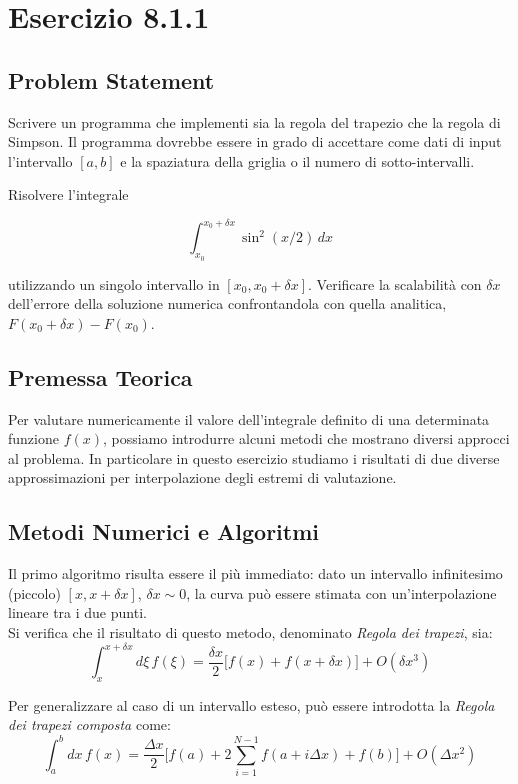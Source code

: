 
\section{Esercizio 8.1.1}
\subsection{Problem Statement}
Scrivere un programma che implementi sia la regola del trapezio che la regola di Simpson. Il programma dovrebbe essere in grado di accettare come dati di input l'intervallo $[a, b]$ e la spaziatura della griglia o il numero di sotto-intervalli.

\noindent Risolvere l'integrale

\[
\int_{x_0}^{x_0+\delta x} \sin^2(x/2) \, dx
\]

\noindent utilizzando un singolo intervallo in $[x_0, x_0 + \delta x]$. Verificare la scalabilità con $\delta x$ dell'errore della soluzione numerica confrontandola con quella analitica, $F(x_0 + \delta x) - F(x_0)$.

\subsection{Premessa Teorica}
Per valutare numericamente il valore dell'integrale definito di una determinata funzione $f(x)$, possiamo introdurre alcuni metodi che mostrano diversi approcci al problema. In particolare in questo esercizio studiamo i risultati di due diverse approssimazioni per interpolazione degli estremi di valutazione.

\subsection{Metodi Numerici e Algoritmi}
Il primo algoritmo risulta essere il più immediato: dato un intervallo infinitesimo (piccolo) $[x, x+\delta x]$, $\delta x \sim 0$, la curva può essere stimata con un'interpolazione lineare tra i due punti.\\
Si verifica che il risultato di questo metodo, denominato \textit{Regola dei trapezi}, sia:
\begin{equation*}
    \int_x^{x+\delta x} d\xi \, f(\xi) = \frac{\delta x}{2} \big[f(x) + f(x+\delta x) \big] + O(\delta x^3)
\end{equation*}

\medskip\noindent
Per generalizzare al caso di un intervallo esteso, può essere introdotta la \textit{Regola dei trapezi composta} come:
\[
\int_a^b dx \, f(x) = \frac{\Delta x}{2} \big[f(a) + 2 \sum_{i=1}^{N-1} f(a+i \Delta x) + f(b) \big] + O(\Delta x^2)
\]

